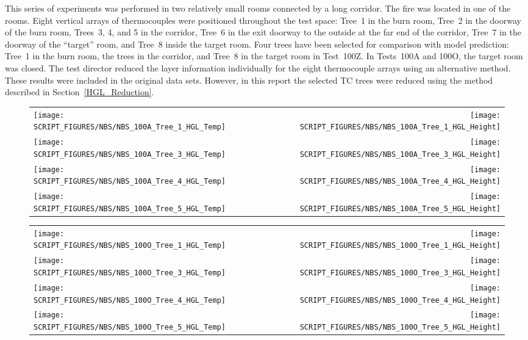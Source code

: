 This series of experiments was performed in two relatively small rooms connected by a long corridor. The fire was located in one of the rooms.  Eight vertical arrays of thermocouples were positioned throughout the test space: Tree~1 in the burn room, Tree~2 in the doorway of the burn room, Trees~3, 4, and 5 in the corridor, Tree~6 in the exit doorway to the outside at the far end of the corridor, Tree~7 in the doorway of the ``target'' room, and Tree~8 inside the target room.  Four trees have been selected for comparison with model prediction: Tree~1 in the burn room, the trees in the corridor, and Tree~8 in the target room in Test~100Z. In Tests~100A and 100O, the target room was closed. The test director reduced the layer information individually for the eight thermocouple arrays using an alternative method. These results were included in the original data sets. However, in this report the selected TC trees were reduced using the method described in Section~\ref{HGL_Reduction}.

\newpage

\begin{figure}[p]
\begin{tabular*}{\textwidth}{l@{\extracolsep{\fill}}r}
\texttt{[image: SCRIPT\_FIGURES/NBS/NBS\_100A\_Tree\_1\_HGL\_Temp]} &
\texttt{[image: SCRIPT\_FIGURES/NBS/NBS\_100A\_Tree\_1\_HGL\_Height]} \\
\texttt{[image: SCRIPT\_FIGURES/NBS/NBS\_100A\_Tree\_3\_HGL\_Temp]} &
\texttt{[image: SCRIPT\_FIGURES/NBS/NBS\_100A\_Tree\_3\_HGL\_Height]} \\
\texttt{[image: SCRIPT\_FIGURES/NBS/NBS\_100A\_Tree\_4\_HGL\_Temp]} &
\texttt{[image: SCRIPT\_FIGURES/NBS/NBS\_100A\_Tree\_4\_HGL\_Height]} \\
\texttt{[image: SCRIPT\_FIGURES/NBS/NBS\_100A\_Tree\_5\_HGL\_Temp]} &
\texttt{[image: SCRIPT\_FIGURES/NBS/NBS\_100A\_Tree\_5\_HGL\_Height]}
\end{tabular*}
\end{figure}

\begin{figure}[p]
\begin{tabular*}{\textwidth}{l@{\extracolsep{\fill}}r}
\texttt{[image: SCRIPT\_FIGURES/NBS/NBS\_100O\_Tree\_1\_HGL\_Temp]} &
\texttt{[image: SCRIPT\_FIGURES/NBS/NBS\_100O\_Tree\_1\_HGL\_Height]} \\
\texttt{[image: SCRIPT\_FIGURES/NBS/NBS\_100O\_Tree\_3\_HGL\_Temp]} &
\texttt{[image: SCRIPT\_FIGURES/NBS/NBS\_100O\_Tree\_3\_HGL\_Height]} \\
\texttt{[image: SCRIPT\_FIGURES/NBS/NBS\_100O\_Tree\_4\_HGL\_Temp]} &
\texttt{[image: SCRIPT\_FIGURES/NBS/NBS\_100O\_Tree\_4\_HGL\_Height]} \\
\texttt{[image: SCRIPT\_FIGURES/NBS/NBS\_100O\_Tree\_5\_HGL\_Temp]} &
\texttt{[image: SCRIPT\_FIGURES/NBS/NBS\_100O\_Tree\_5\_HGL\_Height]}
\end{tabular*}
\end{figure}

